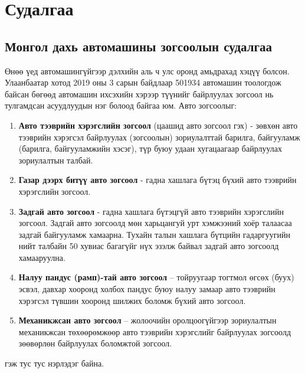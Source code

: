 

\chapter{Судалгаа} %
\label{Chapter1} %


\newcommand{\keyword}[1]{\textbf{#1}}
\newcommand{\tabhead}[1]{\textbf{#1}}
\newcommand{\code}[1]{\texttt{#1}}
\newcommand{\file}[1]{\texttt{\bfseries#1}}
\newcommand{\option}[1]{\texttt{\itshape#1}}

\pagecolor{white}
\section{Монгол дахь автомашины зогсоолын судалгаа}

Өнөө үед автомашингүйгээр дэлхийн аль ч улс оронд амьдрахад хэцүү болсон. Улаанбаатар хотод 2019 оны 3 сарын байдлаар 501934 автомашин тоологдож байсан бөгөөд автомашин ихсэхийн хэрээр түүнийг байрлуулах зогсоол нь  тулгамдсан асуудлуудын нэг болоод байгаа юм.  Авто зогсоолыг: 
\begin{enumerate}
	\item \textbf{Авто тээврийн хэрэгслийн зогсоол} (цаашид авто зогсоол гэх) - зөвхөн авто тээврийн хэрэгсэл байрлуулах (зогсоолын) зориулалттай барилга, байгууламж (барилга, байгууламжийн хэсэг), түр буюу удаан хугацаагаар байрлуулах зориулалтын талбай.
	\item \textbf{Газар дээрх битүү авто зогсоол} - гадна хашлага бүтэц бүхий авто тээврийн хэрэгслийн зогсоол.
	\item \textbf{Задгай авто зогсоол} - гадна хашлага бүтэцгүй авто тээврийн хэрэгслийн зогсоол. Задгай авто зогсоолд мөн харьцангуй урт хэмжээний хоёр талаасаа задгай байгууламж хамаарна. Тухайн талын хашлага бүтцийн гадаргуугийн нийт талбайн 50 хувиас багагүйг нүх эзэлж байвал задгай авто зогсоолд хамааруулна.
	\item \textbf{Налуу пандус (рамп)-тай авто зогсоол} – тойруугаар тогтмол өгсөх (буух) эсвэл, давхар хооронд холбох пандус буюу налуу замаар авто тээврийн хэрэгсэл түвшин хооронд шилжих боломж бүхий авто зогсоол.
	\item \textbf{Механикжсан авто зогсоол} – жолоочийн оролцоогүйгээр зориулалтын механикжсан төхөөрөмжөөр авто тээврийн хэрэгслийг байрлуулах зогсоолд зөөвөрлөн байрлуулах боломжтой зогсоол.
\end{enumerate}
гэж тус тус нэрлэдэг байна.\cite{ners} \\

